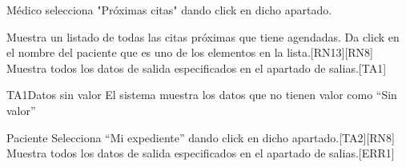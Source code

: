 \begin{UCtrayectoria}{Médico}
        \UCpaso[\UCactor] selecciona "Próximas citas" dando click en dicho apartado.
        
        \UCpaso Muestra un listado de todas las citas próximas que tiene agendadas. 
        \UCpaso[\UCactor] Da click en el nombre del paciente que es uno de los elementos en la lista.[RN13][RN8]
        \UCpaso Muestra todos los datos de salida especificados en el apartado de salias.[TA1]
\end{UCtrayectoria}

\begin{UCtrayectoriaA}{TA1}{Datos sin valor}
    \UCpaso El sistema muestra los datos que no tienen valor como ``Sin valor''
    
\end{UCtrayectoriaA}

\begin{UCtrayectoria}{Paciente}
        \UCpaso[\UCactor] Selecciona ``Mi expediente'' dando click en dicho apartado.[TA2][RN8]
        \UCpaso Muestra todos los datos de salida especificados en el apartado de salias.[ERR1]
\end{UCtrayectoria}
